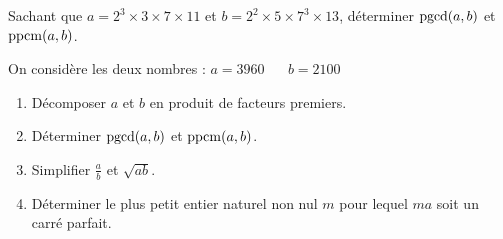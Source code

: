 \documentclass[10pt, a4paper]{article}
\begin{document}
\begin{Exemple}[][5 min]
Sachant que $a = 2^3 \times 3 \times 7 \times 11$ et $b = 2^2 \times 5 \times 7^3 \times 13$, déterminer $\operatorname{pgcd}(a,b)$ et $\operatorname{ppcm}(a,b)$.
\end{Exemple}

\begin{Application}[][20 min]
On considère les deux nombres : $a = 3960$ ~~ $b = 2100$
\begin{enumerate}[leftmargin=*,itemsep=0.5pt]
    \item Décomposer $a$ et $b$ en produit de facteurs premiers.
    \item Déterminer $\operatorname{pgcd}(a,b)$ et $\operatorname{ppcm}(a,b)$.
    \item Simplifier $\frac{a}{b}$ et $\sqrt{ab}$.
    \item Déterminer le plus petit entier naturel non nul $m$ pour lequel $ma$ soit un carré parfait.
\end{enumerate}
\end{Application}
\end{document}
